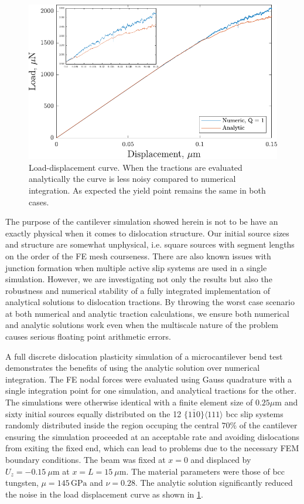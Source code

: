 \documentclass[11pt]{iopart}
\begin{document}
\begin{figure}[t]
    \centering
    \includegraphics[width=0.7\linewidth]{images/load_disp.pdf}
    \caption{Load-displacement curve. When the tractions are evaluated analytically the curve is less noisy compared to numerical integration. As expected the yield point remains the same in both cases.}
    \label{f:load_disp_curve}
\end{figure}

The purpose of the cantilever simulation showed herein is not to be have an exactly physical when it comes to dislocation structure. Our initial source sizes and structure are somewhat unphysical, i.e. square sources with segment lengths on the order of the FE mesh courseness. There are also known issues with junction formation when multiple active slip systems are used in a single simulation. However, we are investigating not only the results but also the robustness and numerical stability of a fully integrated implementation of analytical solutions to dislocation tractions. By throwing the worst case scenario at both numerical and analytic traction calculations, we ensure both numerical and analytic solutions work even when the multiscale nature of the problem causes serious floating point arithmetic errors.

A full discrete dislocation plasticity simulation of a microcantilever bend test demonstrates the benefits of using the analytic solution over numerical integration. The FE nodal forces were evaluated using Gauss quadrature with a single integration point for one simulation, and analytical tractions for the other. The simulations were otherwise identical with a finite element size of $0.25\mu\textrm{m}$ and sixty initial sources equally distributed on the 12 $\{1\bar{1}0\}\langle111\rangle$ bcc slip systems randomly distributed inside the region occuping the central $70\%$ of the cantilever ensuring the simulation proceeded at an acceptable rate and avoiding dislocations from exiting the fixed end, which can lead to problems due to the necessary FEM boundary conditions. The beam was fixed at $x=0$ and displaced by $U_{z}=-0.15~\mu\textrm{m}$ at $x=L=15~\mu\textrm{m}$. The material parameters were those of bcc tungsten, $\mu = 145\,\textrm{GPa}$ and $\nu = 0.28$. The analytic solution significantly reduced the noise in the load displacement curve as shown in \cref{f:load_disp_curve}.
\end{document}
